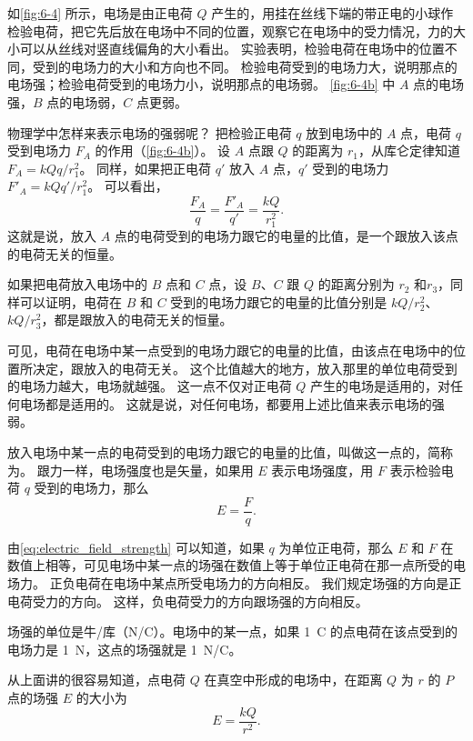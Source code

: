 如\cref{fig:6-4} 所示，电场是由正电荷 $Q$ 产生的，用挂在丝线下端的带正电的小球作检验电荷，把它先后放在电场中不同的位置，观察它在电场中的受力情况，力的大小可以从丝线对竖直线偏角的大小看出。
实验表明，检验电荷在电场中的位置不同，受到的电场力的大小和方向也不同。
检验电荷受到的电场力大，说明那点的电场强；检验电荷受到的电场力小，说明那点的电场弱。
\cref{fig:6-4b} 中 $A$ 点的电场强，$B$ 点的电场弱，$C$ 点更弱。

物理学中怎样来表示电场的强弱呢？
把检验正电荷 $q$ 放到电场中的 $A$ 点，电荷 $q$ 受到电场力 $F_A$ 的作用（\cref{fig:6-4b}）。
设 $A$ 点跟 $Q$ 的距离为 $r_1$，从库仑定律知道 $F_A=kQq/r^2_1$。
同样，如果把正电荷 $q'$ 放入 $A$ 点，$q'$ 受到的电场力 $F'_A=kQq'/r_1^2$。
可以看出，
\[\frac{F_A}{q}=\frac{F'_A}{q'}=\frac{kQ}{r^2_1}.\]
这就是说，放入 $A$ 点的电荷受到的电场力跟它的电量的比值，是一个跟放入该点的电荷无关的恒量。

如果把电荷放入电场中的 $B$ 点和 $C$ 点，设 $B$、$C$ 跟 $Q$ 的距离分别为 $r_2$ 和$r_3$，同样可以证明，电荷在 $B$ 和 $C$ 受到的电场力跟它的电量的比值分别是 $kQ/r^2_2$、$kQ/r_3^2$，都是跟放入的电荷无关的恒量。

可见，电荷在电场中某一点受到的电场力跟它的电量的比值，由该点在电场中的位置所决定，跟放入的电荷无关。
这个比值越大的地方，放入那里的单位电荷受到的电场力越大，电场就越强。
这一点不仅对正电荷 $Q$ 产生的电场是适用的，对任何电场都是适用的。
这就是说，对任何电场，都要用上述比值来表示电场的强弱。

放入电场中某一点的电荷受到的电场力跟它的电量的比值，叫做这一点的，简称为。
跟力一样，电场强度也是矢量，如果用 $E$ 表示电场强度，用 $F$ 表示检验电荷 $q$ 受到的电场力，那么
\begin{equation}
	\label{eq:electric_field_strength}
	E=\frac{F}{q}.
\end{equation}

由\cref{eq:electric_field_strength} 可以知道，如果 $q$ 为单位正电荷，那么 $E$ 和 $F$ 在数值上相等，可见电场中某一点的场强在数值上等于单位正电荷在那一点所受的电场力。
正负电荷在电场中某点所受电场力的方向相反。
我们规定场强的方向是正电荷受力的方向。
这样，负电荷受力的方向跟场强的方向相反。

场强的单位是牛/库（\unit{N/C}）。电场中的某一点，如果 \qty{1}{C} 的点电荷在该点受到的电场力是 \qty{1}{N}，这点的场强就是 \qty{1}{N/C}。

从上面讲的很容易知道，点电荷 $Q$ 在真空中形成的电场中，在距离 $Q$ 为 $r$ 的 $P$ 点的场强 $E$ 的大小为 
\begin{equation}
	\label{eq:electric_field_strength_point}
	E=\frac{kQ}{r^2}.
\end{equation}

